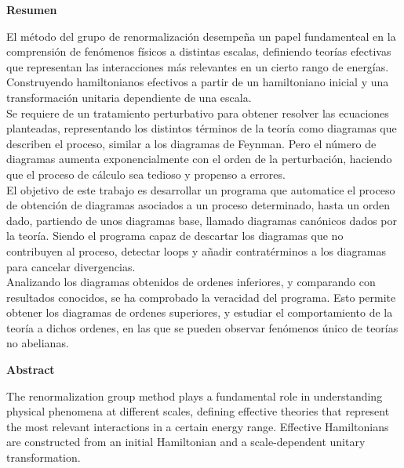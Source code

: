 \documentclass[11pt,a4paper,twoside,pdf]{article}
\numberwithin{equation}{section}
\begin{document}
\newpage
%
\begin{center}
{\bf Resumen}
\bigskip

\begin{minipage}{0.8\linewidth}

El método del grupo de renormalización desempeña un papel fundamenteal en la comprensión
de fenómenos físicos a distintas escalas, definiendo teorías efectivas que
representan las interacciones más relevantes en un cierto rango de energías. 
Construyendo hamiltonianos efectivos a partir de un hamiltoniano inicial y una transformación
unitaria dependiente de una escala.\\

Se requiere de un tratamiento perturbativo para obtener
resolver las ecuaciones planteadas, representando los distintos términos de la teoría como diagramas 
que describen el proceso, similar a los diagramas de Feynman. Pero el número de
diagramas aumenta exponencialmente con el orden de la perturbación, haciendo que
el proceso de cálculo sea tedioso y propenso a errores. \\

El objetivo de este trabajo es desarrollar un programa que automatice el proceso
de obtención de diagramas asociados a un proceso determinado, hasta un orden
dado, partiendo de unos diagramas base, llamado diagramas canónicos dados por la 
teoría. Siendo el programa capaz de descartar los diagramas que no contribuyen al 
proceso, detectar loops y añadir contratérminos a los diagramas para cancelar 
divergencias. \\

Analizando los diagramas obtenidos de ordenes inferiores, y comparando con 
resultados conocidos, se ha comprobado la veracidad del programa. Esto permite
obtener los diagramas de ordenes superiores, y estudiar el comportamiento de la 
teoría a dichos ordenes, en las que se pueden observar fenómenos único de teorías 
no abelianas.

\end{minipage}

\newpage

{\bf Abstract} 
\bigskip

\begin{minipage}{0.8\linewidth}
The renormalization group method plays a fundamental role in understanding
physical phenomena at different scales, defining effective theories that
represent the most relevant interactions in a certain energy range.
Effective Hamiltonians are constructed from an initial Hamiltonian and a scale-dependent
unitary transformation.\\


\end{minipage}
\end{center}
\end{document}
